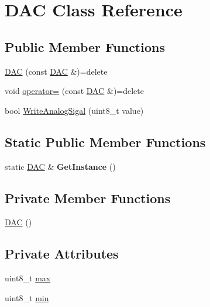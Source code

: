 \hypertarget{class_d_a_c}{}\section{D\+AC Class Reference}
\label{class_d_a_c}
\subsection*{Public Member Functions}
\begin{DoxyCompactItemize}
\item 
\hyperlink{class_d_a_c_af656669246f70c7ccbbd05d0e65088d4}{D\+AC} (const \hyperlink{class_d_a_c}{D\+AC} \&)=delete
\item 
void \hyperlink{class_d_a_c_a9e16a3d53b57588cba0ff2f9ade78e6b}{operator=} (const \hyperlink{class_d_a_c}{D\+AC} \&)=delete
\item 
bool \hyperlink{class_d_a_c_ae7d843a3795822e893fb2b2d996b0666}{Write\+Analog\+Sigal} (uint8\+\_\+t value)
\end{DoxyCompactItemize}
\subsection*{Static Public Member Functions}
\begin{DoxyCompactItemize}
\item 
static \hyperlink{class_d_a_c}{D\+AC} \& {\bfseries Get\+Instance} ()\hypertarget{class_d_a_c_aa97df751677eb0db87b3e3a5a1cb6049}{}\label{class_d_a_c_aa97df751677eb0db87b3e3a5a1cb6049}

\end{DoxyCompactItemize}
\subsection*{Private Member Functions}
\begin{DoxyCompactItemize}
\item 
\hyperlink{class_d_a_c_a9908e07a5c096380eeb4c4061d58476d}{D\+AC} ()
\end{DoxyCompactItemize}
\subsection*{Private Attributes}
\begin{DoxyCompactItemize}
\item 
uint8\+\_\+t \hyperlink{class_d_a_c_a229a81d8ebf43511dfb6815c5cd8f425}{max}
\item 
uint8\+\_\+t \hyperlink{class_d_a_c_aa4f21cf166374cfc6edcd412f4d2072b}{min}
\end{DoxyCompactItemize}


